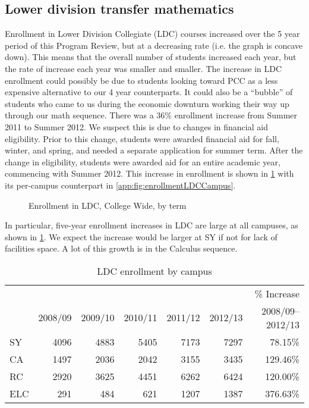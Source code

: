\subsection{Lower division transfer mathematics}
Enrollment in Lower Division Collegiate (LDC) courses increased over the 5
year period of this Program Review, but at a decreasing rate (i.e. the graph is concave down). This means that the overall number of students increased each year, but the rate of increase each year was smaller and smaller. The increase in LDC enrollment could possibly be due to students looking toward PCC as a less expensive alternative to our 4 year counterparts. It could also be a ``bubble'' of students who came to us during the economic downturn working their way up through our math sequence.  There was a 36\% enrollment increase from Summer 2011 to Summer 2012. We suspect this is due to
changes in financial aid eligibility. Prior to this change, students were
awarded financial aid for fall, winter, and spring, and needed a separate
application for summer term.  After the change in eligibility, students were
awarded aid for an entire academic year, commencing with Summer 2012.
This increase in enrollment is shown in \cref{needs:fig:enrollmentLDCTerm} with
its per-campus counterpart in \vref{app:fig:enrollmentLDCCampus}.


\begin{figure}[!htb]
	\centering
	
	\caption{Enrollment in LDC, College Wide, by term}
	\label{needs:fig:enrollmentLDCTerm}
\end{figure}

In particular, five-year enrollment increases  in LDC are large at all
campuses, as shown in \cref{needs:tab:LDCenrollmentCampus}.  We expect the
increase would be larger at SY if not for lack of facilities space. A lot of
this growth is in the Calculus sequence.

\begin{table}[!htb]
	\centering
	\caption{LDC enrollment by campus}
	\label{needs:tab:LDCenrollmentCampus}
	\begin{tabularx}{\linewidth}{X*{6}{r}}
		\toprule
		    &        &        &        &        &        & \% Increase \\
		    & 2008/09 & 2009/10 & 2010/11 & 2011/12 & 2012/13 & 2008/09--2012/13   \\
		\midrule
		SY  & 4096   & 4883   & 5405   & 7173   & 7297   & 78.15\%     \\
		CA  & 1497   & 2036   & 2042   & 3155   & 3435   & 129.46\%    \\
		RC  & 2920   & 3625   & 4451   & 6262   & 6424   & 120.00\%    \\
		ELC & 291    & 484    & 621    & 1207   & 1387   & 376.63\%    \\
		\bottomrule
	\end{tabularx}
\end{table}

